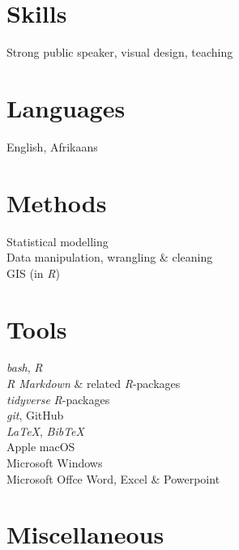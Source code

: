 \documentclass[10pt]{article}
\begin{document}
\begin{multicols}{2}

\section*{Skills} %

Strong public speaker, visual design, teaching

\section*{Languages} %

English, Afrikaans

\section*{Methods} %

Statistical modelling \\
Data manipulation, wrangling \& cleaning \\
GIS (in \textit{R})

\columnbreak

\section*{Tools} %

\textit{bash}, \textit{R} \\
\textit{R Markdown} \& related \textit{R}-packages \\
\textit{tidyverse} \textit{R}-packages \\
\textit{git}, GitHub \\
\textit{LaTeX}, \textit{BibTeX} \\
Apple macOS \\
Microsoft Windows \\
Microsoft Offce Word, Excel \& Powerpoint

\end{multicols}

\clearpage %

\section*{Miscellaneous} %
\end{document}
